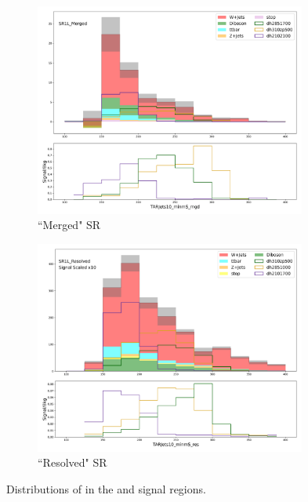 \begin{figure}[htbp]
  \centering

     \begin{subfigure}{0.49\textwidth}
     \includegraphics[width = 0.98\textwidth]{Figures/5/ms/SR1L_Merged/TARJets10_minmS_mgd.png}
     \caption{``Merged" SR}
     \end{subfigure}
     \begin{subfigure}{0.49\textwidth}
     \includegraphics[width = 0.98\textwidth]{Figures/5/ms/SR1L_Resolved/TARJets10_minmS_res.png}
     \caption{``Resolved" SR}
     \end{subfigure}

     \caption{Distributions of \minms in the \merged and \resolved signal regions.}
     \label{fig:ms}
  \end{figure}

